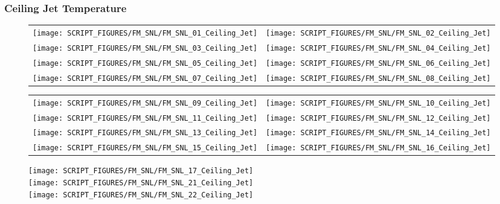 \clearpage

\subsubsection{Ceiling Jet Temperature}

\begin{figure}[!ht]
\begin{tabular*}{\textwidth}{l@{\extracolsep{\fill}}r}
\texttt{[image: SCRIPT\_FIGURES/FM\_SNL/FM\_SNL\_01\_Ceiling\_Jet]} &
\texttt{[image: SCRIPT\_FIGURES/FM\_SNL/FM\_SNL\_02\_Ceiling\_Jet]} \\
\texttt{[image: SCRIPT\_FIGURES/FM\_SNL/FM\_SNL\_03\_Ceiling\_Jet]} &
\texttt{[image: SCRIPT\_FIGURES/FM\_SNL/FM\_SNL\_04\_Ceiling\_Jet]} \\
\texttt{[image: SCRIPT\_FIGURES/FM\_SNL/FM\_SNL\_05\_Ceiling\_Jet]} &
\texttt{[image: SCRIPT\_FIGURES/FM\_SNL/FM\_SNL\_06\_Ceiling\_Jet]} \\
\texttt{[image: SCRIPT\_FIGURES/FM\_SNL/FM\_SNL\_07\_Ceiling\_Jet]} &
\texttt{[image: SCRIPT\_FIGURES/FM\_SNL/FM\_SNL\_08\_Ceiling\_Jet]}
\end{tabular*}
\end{figure}

\begin{figure}[!ht]
\begin{tabular*}{\textwidth}{l@{\extracolsep{\fill}}r}
\texttt{[image: SCRIPT\_FIGURES/FM\_SNL/FM\_SNL\_09\_Ceiling\_Jet]} &
\texttt{[image: SCRIPT\_FIGURES/FM\_SNL/FM\_SNL\_10\_Ceiling\_Jet]} \\
\texttt{[image: SCRIPT\_FIGURES/FM\_SNL/FM\_SNL\_11\_Ceiling\_Jet]} &
\texttt{[image: SCRIPT\_FIGURES/FM\_SNL/FM\_SNL\_12\_Ceiling\_Jet]} \\
\texttt{[image: SCRIPT\_FIGURES/FM\_SNL/FM\_SNL\_13\_Ceiling\_Jet]} &
\texttt{[image: SCRIPT\_FIGURES/FM\_SNL/FM\_SNL\_14\_Ceiling\_Jet]} \\
\texttt{[image: SCRIPT\_FIGURES/FM\_SNL/FM\_SNL\_15\_Ceiling\_Jet]} &
\texttt{[image: SCRIPT\_FIGURES/FM\_SNL/FM\_SNL\_16\_Ceiling\_Jet]}
\end{tabular*}
\end{figure}

\begin{figure}[!ht]
\begin{center}
\texttt{[image: SCRIPT\_FIGURES/FM\_SNL/FM\_SNL\_17\_Ceiling\_Jet]} \\
\texttt{[image: SCRIPT\_FIGURES/FM\_SNL/FM\_SNL\_21\_Ceiling\_Jet]} \\
\texttt{[image: SCRIPT\_FIGURES/FM\_SNL/FM\_SNL\_22\_Ceiling\_Jet]}
\end{center}
\end{figure}

